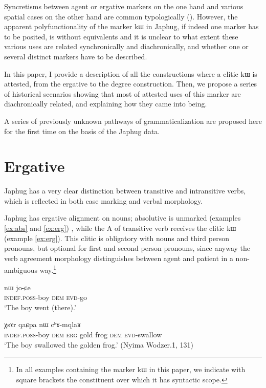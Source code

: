 \documentclass[oldfontcommands,oneside,a4paper,11pt]{article}
\newcommand{\ipa}[1]{{\phon #1}} %
\begin{document}
Syncretisms between agent or ergative markers  on the one hand and various spatial cases on the other hand are common typologically (\citealt{agent02palancar}). However, the apparent polyfunctionality of the marker \ipa{kɯ} in Japhug, if indeed one marker has to be posited, is without equivalents and it is unclear to what extent these various uses are related synchronically and diachronically, and whether one or several distinct markers have to be described.
 
 In this paper, I provide a description of all the constructions where a clitic \ipa{kɯ} is attested, from the ergative to the degree construction. Then, we propose a series of historical scenarios showing that most of  attested uses of this marker are diachronically related, and explaining how they  came into being.

 A series of previously unknown pathways of grammaticalization are proposed here for the first time on the basis of the Japhug data.

\section{Ergative} \label{sec:erg}
Japhug has a very clear   distinction between transitive and intransitive verbs, which is reflected in both case marking and verbal morphology.

Japhug has ergative alignment on nouns; absolutive is unmarked (examples \ref{ex:abs} and \ref{ex:erg}) , while the A of transitive verb receives the clitic \ipa{kɯ} (example \ref{ex:erg}). This clitic is obligatory with nouns and third person pronouns, but optional for first and second person pronouns, since anyway the verb agreement morphology distinguishes between agent and patient in a non-ambiguous way.\footnote{In all examples containing the marker \ipa{kɯ} in this paper, we indicate with square brackets the constituent over which it has syntactic scope.}

\begin{exe}
\ex \label{ex:abs}
\gll \ipa{tɤ-tɕɯ}  	\ipa{nɯ}  	 	\ipa{jo-ɕe}   \\
\textsc{indef.poss}-boy \textsc{dem}   \textsc{evd}-go \\
\glt `The boy went (there).'
\end{exe}

\begin{exe}
\ex \label{ex:erg}
\gll [\ipa{tɤ-tɕɯ}  	\ipa{nɯ}]  	\ipa{\textbf{kɯ}} 	\ipa{χsɤr}  	\ipa{qaɕpa}  	\ipa{nɯ}  	\ipa{cʰɤ-mqlaʁ}   \\
\textsc{indef.poss}-boy \textsc{dem} \textsc{erg} gold frog \textsc{dem} \textsc{evd}-swallow \\
\glt `The boy swallowed the golden frog.' (Nyima Wodzer.1, 131)
\end{exe}
\end{document}
